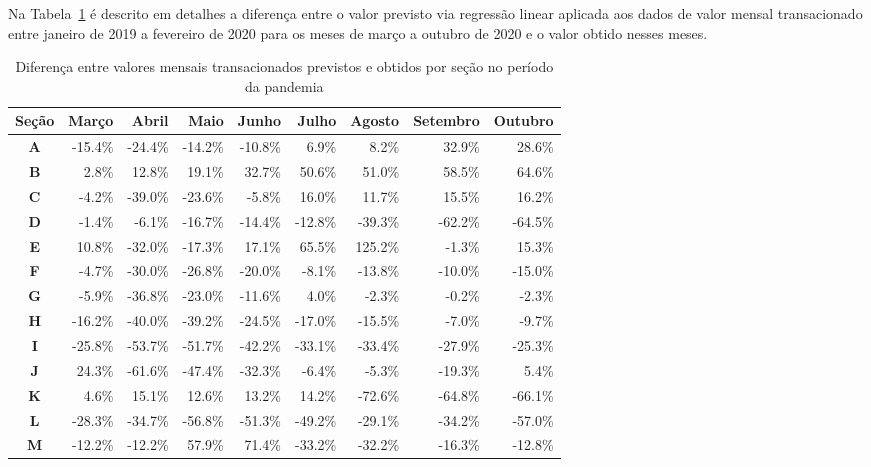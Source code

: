 Na Tabela~\ref{tab:pandemia:variacao-mensal-por-secao} é descrito em detalhes a diferença entre o valor previsto via regressão linear aplicada aos dados de valor mensal transacionado entre janeiro de 2019 a fevereiro de 2020 para os meses de março a outubro de 2020 e o valor obtido nesses meses.

\begin{table}[htb]
\centering
\caption{Diferença entre valores mensais transacionados previstos e obtidos por seção no período da pandemia}
\label{tab:pandemia:variacao-mensal-por-secao}
    \begin{tabular}{c|r|r|r|r|r|r|r|r}
        \toprule
        \textbf{Seção} & Março & Abril & Maio & Junho & Julho & Agosto & Setembro & Outubro \\
        \midrule
        \textbf{A} & -15.4\% & -24.4\% & -14.2\% & -10.8\% &   6.9\% &   8.2\% &  32.9\% &  28.6\% \\
        \textbf{B} &   2.8\% &  12.8\% &  19.1\% &  32.7\% &  50.6\% &  51.0\% &  58.5\% &  64.6\% \\
        \textbf{C} &  -4.2\% & -39.0\% & -23.6\% &  -5.8\% &  16.0\% &  11.7\% &  15.5\% &  16.2\% \\
        \textbf{D} &  -1.4\% &  -6.1\% & -16.7\% & -14.4\% & -12.8\% & -39.3\% & -62.2\% & -64.5\% \\
        \textbf{E} &  10.8\% & -32.0\% & -17.3\% &  17.1\% &  65.5\% & 125.2\% &  -1.3\% &  15.3\% \\
        \textbf{F} &  -4.7\% & -30.0\% & -26.8\% & -20.0\% &  -8.1\% & -13.8\% & -10.0\% & -15.0\% \\
        \textbf{G} &  -5.9\% & -36.8\% & -23.0\% & -11.6\% &   4.0\% &  -2.3\% &  -0.2\% &  -2.3\% \\
        \textbf{H} & -16.2\% & -40.0\% & -39.2\% & -24.5\% & -17.0\% & -15.5\% &  -7.0\% &  -9.7\% \\
        \textbf{I} & -25.8\% & -53.7\% & -51.7\% & -42.2\% & -33.1\% & -33.4\% & -27.9\% & -25.3\% \\
        \textbf{J} &  24.3\% & -61.6\% & -47.4\% & -32.3\% &  -6.4\% &  -5.3\% & -19.3\% &   5.4\% \\
        \textbf{K} &   4.6\% &  15.1\% &  12.6\% &  13.2\% &  14.2\% & -72.6\% & -64.8\% & -66.1\% \\
        \textbf{L} & -28.3\% & -34.7\% & -56.8\% & -51.3\% & -49.2\% & -29.1\% & -34.2\% & -57.0\% \\
        \textbf{M} & -12.2\% & -12.2\% &  57.9\% &  71.4\% & -33.2\% & -32.2\% & -16.3\% & -12.8\% \\

\end{tabular}
\end{table}
